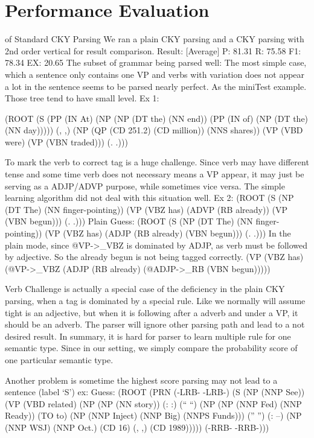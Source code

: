 \documentclass[letterpaper]{article}
\begin{document}
\section{Performance Evaluation} 
of Standard CKY Parsing
We ran a plain CKY parsing and a CKY parsing with 2nd order vertical for result comparison. 
Result: [Average]    P: 81.31   R: 75.58   F1: 78.34   EX: 20.65
The subset of grammar being parsed well:
The most simple case, which a sentence only contains one VP and verbs with variation does not appear a lot in the sentence seems to be parsed nearly perfect. As the miniTest example. Those tree tend to have small level.
Ex 1:
 
(ROOT
  (S
    (PP (IN At)
      (NP
        (NP (DT the) (NN end))
        (PP (IN of)
          (NP (DT the) (NN day)))))
    (, ,)
    (NP
      (QP (CD 251.2) (CD million))
      (NNS shares))
    (VP (VBD were)
      (VP (VBN traded)))
    (. .)))


To mark the verb to correct tag is a huge challenge. Since verb may have different tense and some time verb does not necessary means a VP appear, it may just be serving as a ADJP/ADVP purpose, while sometimes vice versa. The simple learning algorithm did not deal with this situation well.
Ex 2:
(ROOT
  (S
    (NP (DT The) (NN finger-pointing))
    (VP (VBZ has)
      (ADVP (RB already))
      (VP (VBN begun)))
    (. .)))
Plain Guess:
(ROOT
  (S
    (NP (DT The) (NN finger-pointing))
    (VP (VBZ has)
      (ADJP (RB already) (VBN begun)))
    (. .)))
In the plain mode, since @VP->_VBZ is dominated by ADJP, as verb must be followed by adjective. So the already begun is not being tagged correctly.
(VP (VBZ has)
        (@VP->_VBZ
          (ADJP (RB already)
            (@ADJP->_RB (VBN begun)))))

Verb Challenge is actually a special case of the deficiency in the plain CKY parsing, when a tag is dominated by a special rule. Like we normally will assume tight is an adjective, but when it is following after a adverb and under a VP, it should be an adverb. The parser will ignore other parsing path and lead to a not desired result. 
In summary, it is hard for parser to learn multiple rule for one semantic type. Since in our setting, we simply compare the probability score of one particular semantic type. 

Another problem is sometime the highest score parsing may not lead to a sentence (label ‘S’)
ex:
Guess:
(ROOT
  (PRN (-LRB- -LRB-)
    (S
      (NP (NNP See))
      (VP (VBD related)
        (NP
          (NP (NN story))
          (: :) (`` ``)
          (NP
            (NP (NNP Fed) (NNP Ready))
            (TO to)
            (NP (NNP Inject) (NNP Big) (NNPS Funds)))
          ('' '') (: --)
          (NP (NNP WSJ) (NNP Oct.) (CD 16) (, ,) (CD 1989)))))
    (-RRB- -RRB-)))
\end{document}
